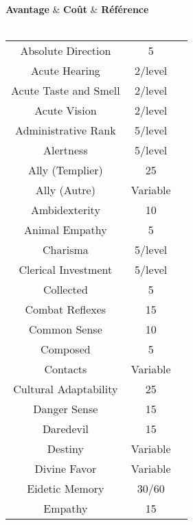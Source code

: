 \begin{center} 
\tablehead
	{\hline \textbf{Avantage} & \textbf{Coût} & \textbf{Référence}\\ \hline}
\tabletail
	{\hline {}\\}
\tablelasttail
	{\hline}
\begin{supertabular}{|c|c|c|}
\hline 
Absolute Direction & 5 & \cite[p.19]{B} \\ 
Acute Hearing & 2/level & \cite[p.19]{B} \\ 
Acute Taste and Smell & 2/level & \cite[p.19]{B} \\ 
Acute Vision & 2/level & \cite[p.19]{B} \\
Administrative Rank & 5/level & \cite[p.19]{CI} \\
Alertness & 5/level & \cite[p.19]{B} \\
Ally (Templier) & 25 & \cite[p.23]{B} \\ 
Ally (Autre) & Variable & \cite[p.23]{B} \\ 
Ambidexterity & 10 & \cite[p.19]{B} \\
Animal Empathy & 5 & \cite[p.19]{B} \\
Charisma & 5/level & \cite[p.19]{B} \\
Clerical Investment & 5/level & \cite[p.92]{R} \\
Collected & 5 & \cite[p.22]{CI} \\
Combat Reflexes & 15 & \cite[p.20]{B} \\
Common Sense & 10 & \cite[p.20]{B} \\
Composed & 5 & \cite[p.22]{CI} \\
Contacts & Variable & \cite[p.22]{CI} \\
Cultural Adaptability & 25 & \cite[p.23]{CI} \\
Danger Sense & 15 & \cite[p.20]{B} \\
Daredevil & 15 & \cite[p.23]{CI} \\
Destiny & Variable & \cite[p.35]{CI} \\
Divine Favor & Variable & \cite[p.36]{CI} \\
Eidetic Memory & 30/60 & \cite[p.20]{B} \\
Empathy & 15 & \cite[p.20]{B} \\

\end{supertabular}
\end{center}

